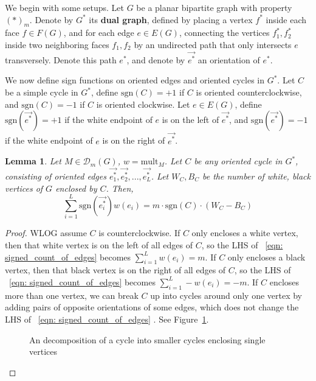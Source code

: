\documentclass[11pt]{amsart}
\newtheorem{lem}[thm]{Lemma}
\theoremstyle{definition}
\theoremstyle{remark}
\numberwithin{equation}{section}
\begin{document}
We begin with some setups. Let $G$ be a planar bipartite graph with property $(*)_m$. Denote by $G^*$ its \textbf{dual graph}, defined by placing a vertex $f^*$ inside each face $f\in F(G)$, and for each edge $e\in E(G)$, connecting the vertices $f^*_1,f^*_2$ inside two neighboring faces $f_1,f_2$ by an undirected path that only intersects $e$ transversely. Denote this path $e^*$, and denote by $\Vec{e^*}$ an orientation of $e^*$.

We now define sign functions on oriented edges and oriented cycles in $G^*$. Let $C$ be a simple cycle in $G^*$, define $\text{sgn}(C) = +1$ if $C$ is oriented counterclockwise, and $\text{sgn}(C) = -1$ if $C$ is oriented clockwise. Let $e\in E(G)$, define $\text{sgn}(\Vec{e^*}) = +1$ if the white endpoint of $e$ is on the left of $\Vec{e^*}$, and $\text{sgn}(\Vec{e^*}) = -1$ if the white endpoint of $e$ is on the right of $\Vec{e^*}$. 

\begin{lem}\label{lem: edge_mult_equations}
    Let $M\in \mathcal{D}_{m}(G)$, $w = \text{mult}_M$. Let $C$ be any oriented cycle in $G^*$, consisting of oriented edges $\Vec{e_1^*},\Vec{e_2^*},...,\Vec{e_L^*}$. Let $W_C, B_C$ be the number of white, black vertices of $G$ enclosed by $C$. Then,
    \begin{equation}\label{eqn: signed_count_of_edges}
        \sum^L_{i=1}\text{sgn}(\Vec{e_i^*})w(e_i) = m\cdot\text{sgn}(C)\cdot(W_C-B_C)
    \end{equation}
\end{lem}
\begin{proof}
    WLOG assume $C$ is counterclockwise. If $C$ only encloses a white vertex, then that white vertex is on the left of all edges of $C$, so the LHS of ~\ref{eqn: signed_count_of_edges} becomes $\sum^L_{i=1}w(e_i) = m$. If $C$ only encloses a black vertex, then that black vertex is on the right of all edges of $C$, so the LHS of ~\ref{eqn: signed_count_of_edges}  becomes $\sum^L_{i=1}-w(e_i) = -m$. If $C$ encloses more than one vertex, we can break $C$ up into cycles around only one vertex by adding pairs of opposite orientations of some edges, which does not change the LHS of ~\ref{eqn: signed_count_of_edges} . See Figure~\ref{fig:decompose_cycles}.

    \begin{figure}[h!]
    \centering
    
    \caption{An decomposition of a cycle into smaller cycles enclosing single vertices}
    \label{fig:decompose_cycles}
    \end{figure}

\end{proof}
\end{document}
